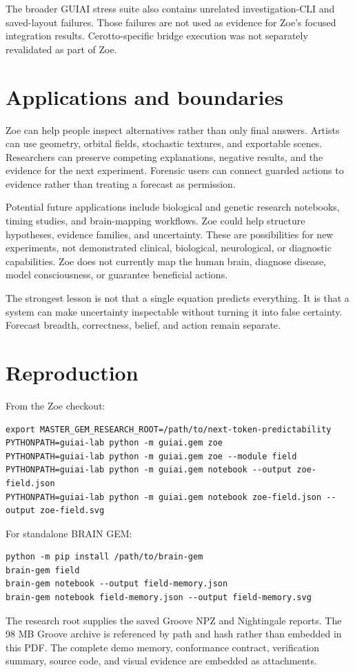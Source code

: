 \documentclass[11pt,a4paper]{article}
\begin{document}
The broader GUIAI stress suite also contains unrelated investigation-CLI and saved-layout failures. Those failures are not used as evidence for Zoe's focused integration results. Cerotto-specific bridge execution was not separately revalidated as part of Zoe.

\section{Applications and boundaries}
Zoe can help people inspect alternatives rather than only final answers. Artists can use geometry, orbital fields, stochastic textures, and exportable scenes. Researchers can preserve competing explanations, negative results, and the evidence for the next experiment. Forensic users can connect guarded actions to evidence rather than treating a forecast as permission.

Potential future applications include biological and genetic research notebooks, timing studies, and brain-mapping workflows. Zoe could help structure hypotheses, evidence families, and uncertainty. These are possibilities for new experiments, not demonstrated clinical, biological, neurological, or diagnostic capabilities. Zoe does not currently map the human brain, diagnose disease, model consciousness, or guarantee beneficial actions.

The strongest lesson is not that a single equation predicts everything. It is that a system can make uncertainty inspectable without turning it into false certainty. Forecast breadth, correctness, belief, and action remain separate.

\section{Reproduction}
From the Zoe checkout:
\begin{lstlisting}
export MASTER_GEM_RESEARCH_ROOT=/path/to/next-token-predictability
PYTHONPATH=guiai-lab python -m guiai.gem zoe
PYTHONPATH=guiai-lab python -m guiai.gem zoe --module field
PYTHONPATH=guiai-lab python -m guiai.gem notebook --output zoe-field.json
PYTHONPATH=guiai-lab python -m guiai.gem notebook zoe-field.json --output zoe-field.svg
\end{lstlisting}
For standalone BRAIN GEM:
\begin{lstlisting}
python -m pip install /path/to/brain-gem
brain-gem field
brain-gem notebook --output field-memory.json
brain-gem notebook field-memory.json --output field-memory.svg
\end{lstlisting}
The research root supplies the saved Groove NPZ and Nightingale reports. The 98 MB Groove archive is referenced by path and hash rather than embedded in this PDF. The complete demo memory, conformance contract, verification summary, source code, and visual evidence are embedded as attachments.
\end{document}
